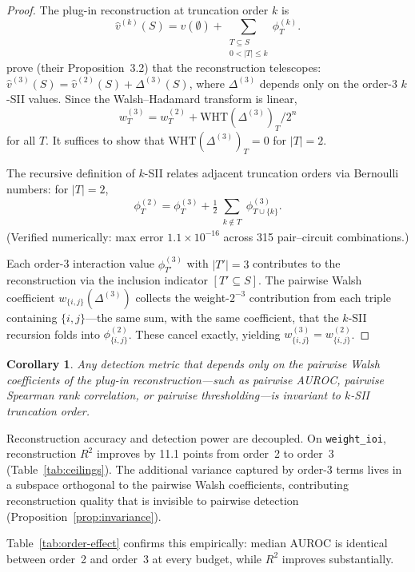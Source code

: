 \documentclass[10pt]{article}
\newtheorem{corollary}{Corollary}
\begin{document}
\begin{proof}
The plug-in reconstruction at truncation order $k$ is
\[
  \hat{v}^{(k)}(S) = v(\emptyset) + \sum_{\substack{T \subseteq S \\ 0 < |T| \leq k}} \phi^{(k)}_T.
\]
\citet{fumagalli2024kernelshapiq} prove (their Proposition~3.2) that
the reconstruction telescopes:
$\hat{v}^{(3)}(S) = \hat{v}^{(2)}(S) + \Delta^{(3)}(S)$,
where $\Delta^{(3)}$ depends only on the order-3 $k$-SII values.
Since the Walsh--Hadamard transform is linear,
\[
  w^{(3)}_T = w^{(2)}_T + \text{WHT}(\Delta^{(3)})_T / 2^n
\]
for all $T$. It suffices to show that
$\text{WHT}(\Delta^{(3)})_T = 0$ for $|T| = 2$.

The recursive definition of $k$-SII
\citep{bordt2023shapley} relates adjacent truncation orders via
Bernoulli numbers: for $|T| = 2$,
\[
  \phi^{(2)}_T = \phi^{(3)}_T + \tfrac{1}{2}
    \sum_{\substack{k \notin T}} \phi^{(3)}_{T \cup \{k\}}.
\]
(Verified numerically: max error $1.1 \times 10^{-16}$ across 315
pair--circuit combinations.)

Each order-3 interaction value $\phi^{(3)}_{T'}$ with $|T'| = 3$
contributes to the reconstruction via the inclusion indicator
$[T' \subseteq S]$. The pairwise Walsh coefficient
$w_{\{i,j\}}(\Delta^{(3)})$ collects the weight-$2^{-3}$ contribution
from each triple containing $\{i,j\}$---the same sum, with the same
coefficient, that the $k$-SII recursion folds into
$\phi^{(2)}_{\{i,j\}}$. These cancel exactly, yielding
$w^{(3)}_{\{i,j\}} = w^{(2)}_{\{i,j\}}$. \qedhere
\end{proof}

\begin{corollary}
Any detection metric that depends only on the pairwise Walsh
coefficients of the plug-in reconstruction---such as pairwise
AUROC, pairwise Spearman rank correlation, or pairwise
thresholding---is invariant to $k$-SII truncation order.
\end{corollary}

Reconstruction accuracy and detection power are decoupled.
On \texttt{weight\_ioi}, reconstruction $R^2$ improves by 11.1
points from order~2 to order~3 (Table~\ref{tab:ceilings}).
The additional variance captured by order-3 terms lives in a
subspace orthogonal to the pairwise Walsh coefficients, contributing
reconstruction quality that is invisible to pairwise detection
(Proposition~\ref{prop:invariance}).

Table~\ref{tab:order-effect} confirms this empirically: median
AUROC is identical between order~2 and order~3 at every budget,
while $R^2$ improves substantially.
\end{document}

